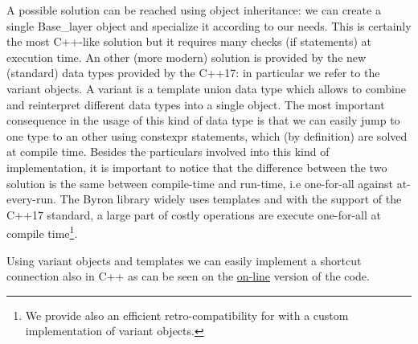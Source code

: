 \documentclass{standalone}
\begin{document}
A possible solution can be reached using object inheritance: we can create a single \textsf{Base\_layer} object and specialize it according to our needs.
This is certainly the most \textsf{C++}-like solution but it requires many checks (if statements) at execution time.
An other (more modern) solution is provided by the new (standard) data types provided by the \textsf{C++17}: in particular we refer to the \textsf{variant} objects.
A \textsf{variant} is a \textsf{template union} data type which allows to combine and reinterpret different data types into a single object.
The most important consequence in the usage of this kind of data type is that we can easily jump to one type to an other using \textsf{constexpr} statements, which (by definition) are solved at compile time.
Besides the particulars involved into this kind of implementation, it is important to notice that the difference between the two solution is the same between compile-time and run-time, i.e one-for-all against at-every-run.
The \textsf{Byron} library widely uses \textsf{template}s and with the support of the \textsf{C++17} standard, a large part of costly operations are execute one-for-all at compile time\footnote{
  We provide also an efficient retro-compatibility for  with a custom implementation of \textsf{variant} objects.
}.

Using \textsf{variant} objects and \textsf{templates} we can easily implement a shortcut connection also in \textsf{C++} as can be seen on the \href{https://github.com/Nico-Curti/Byron/blob/master/src/shortcut_layer.cpp}{on-line} version of the code.
\end{document}
